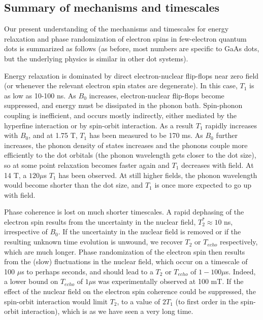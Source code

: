\documentclass[rmp,twocolumn,aps]{revtex4}
\begin{document}
\subsection{Summary of mechanisms and timescales}

Our present understanding of the mechanisms and timescales for
energy relaxation and phase randomization of electron spins in
few-electron quantum dots is summarized as follows (as before, most numbers are specific to GaAs dots, but the underlying physics is similar in other dot systems).

Energy relaxation is dominated by direct electron-nuclear
flip-flops near zero field (or whenever the relevant electron spin
states are degenerate). In this case, $T_1$ is as low as 10-100
ns. As $B_0$ increases, electron-nuclear flip-flops become
suppressed, and energy must be dissipated in the phonon bath. Spin-phonon coupling is inefficient, and occurs mostly indirectly, either mediated by the hyperfine interaction or by spin-orbit interaction. As a result $T_1$ rapidly increases with $B_0$, and at 1.75 T, $T_1$ has been measured to be 170 ms. As $B_0$ further increases, the phonon density of states
increases and the phonons couple more efficiently to the dot
orbitals (the phonon wavelength gets closer to the dot size), so
at some point relaxation becomes faster again and $T_1$ decreases with field. At 14 T, a $120 \mu$s $T_1$ has been observed. At still higher fields, the phonon wavelength would become shorter than the dot size, and $T_1$ is once more expected to go up with field.

Phase coherence is lost on much shorter timescales. A rapid dephasing of the electron spin results from the
uncertainty in the nuclear field, $T_2^*\approx 10$ ns, irrespective of
$B_0$. If the uncertainty in the nuclear field is removed or if
the resulting unknown time evolution is unwound, we recover $T_2$ or $T_{echo}$ respectively, which are much longer. Phase randomization of the electron spin then results from the (slow) fluctuations in the nuclear field, which occur on a timescale of 100 $\mu$s to perhaps seconds, and should lead to a $T_2$ or $T_{echo}$ of $1-100 \mu$s. Indeed, a lower bound on $T_{echo}$ of $1 \mu$s was experimentally observed at 100 mT. If the effect of the nuclear field on the electron spin coherence could be suppressed, the spin-orbit interaction would limit $T_2$, to a value of $2T_1$ (to first order in the spin-orbit interaction), which is as we have seen a very long time.

\end{document}
